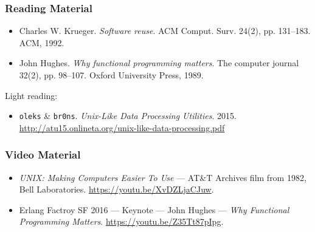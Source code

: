 \begin{frame}

\frametitle{Reading Material}

\footnotesize

\begin{itemize}

\item Charles W. Krueger. \emph{Software reuse}. ACM Comput. Surv. 24(2),
pp. 131--183. ACM, 1992.

\item John Hughes. \emph{Why functional programming matters}. The computer
journal 32(2), pp. 98--107. Oxford University Press, 1989.

\end{itemize}

Light reading:

\begin{itemize}

\item \texttt{oleks} \& \texttt{br0ns}. \emph{Unix-Like Data Processing
Utilities}. 2015. \url{http://atu15.onlineta.org/unix-like-data-processing.pdf}

\end{itemize}

\end{frame}


\begin{frame}

\frametitle{Video Material}

\footnotesize

\begin{itemize}

\item \emph{UNIX: Making Computers Easier To Use} --- AT\&T Archives film from
1982, Bell Laboratories. \url{https://youtu.be/XvDZLjaCJuw}.

\item Erlang Factroy SF 2016 --- Keynote --- John Hughes --- \emph{Why
Functional Programming Matters}. \url{https://youtu.be/Z35Tt87pIpg}.

\end{itemize}

\end{frame}


